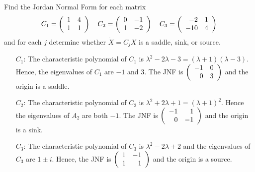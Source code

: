 \documentclass{ximera}
\author{Matthew Carr}
\begin{document}

\begin{exercise}\label{mc11_3A}

Find the Jordan Normal Form for each matrix 
\[
C_1 = \left(\begin{array}{rrrrrrrrrrrrrrrrrr}  1 & 4 \\ 1 & 1 \end{array}\right) \quad C_2 = \left(\begin{array}{rrrrrrrrrrrrrrrrrr}  0 & -1 \\ 1 & -2  \end{array}\right) \quad C_3 = \left(\begin{array}{rrrrrrrrrrrrrrrrrr}  -2 & 1 \\ -10 & 4 \end{array}\right)
\]
and for each $j$ determine whether $\dot{X} = C_jX$ is a saddle, sink, or source.
  
\begin{solution}


\soln 
\begin{itemize}
\item[$C_1$:] The characteristic polynomial of $C_1$ is $\lambda^2 -2\lambda -3 = (\lambda+1)(\lambda-3)$.  Hence, the eigenvalues of $C_1$ are $-1$ and $3$.  The JNF is $\left(\begin{array}{rrrrrrrrrrrrrrrrrr} -1 & 0 \\ 0 & 3 \end{array}\right)$ and the origin is a saddle.

\item[$C_2$:] The characteristic polynomial of $C_2$ is $\lambda^2 +2\lambda+ 1 = (\lambda+1)^2$.  Hence the eigenvalues of $A_2$ are both $-1$.  The JNF is $\left(\begin{array}{rrrrrrrrrrrrrrrrrr} -1 & 1 \\ 0 & -1 \end{array}\right)$ and the origin is a sink.

\item[$C_3$:] The characteristic polynomial of $C_3$ is $\lambda^2 - 2\lambda + 2$ and the eigenvalues of $C_3$ are $1 \pm i$.  Hence, the JNF is $\left(\begin{array}{rrrrrrrrrrrrrrrrrr} 1 & -1 \\ 1 & 1 \end{array}\right)$ and the origin is a source.
\end{itemize}

\end{solution}
\end{exercise}
\end{document}

